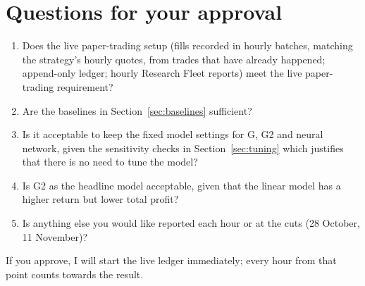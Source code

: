 \documentclass[11pt,a4paper]{article}
\begin{document}
\section{Questions for your approval}\label{sec:questions}
\begin{enumerate}[leftmargin=*]
  \item[$\square$] Does the live paper-trading setup (fills recorded in hourly batches, matching the strategy's
    hourly quotes, from trades that have already happened; append-only ledger; hourly Research Fleet reports) meet
    the live paper-trading requirement?
  \item[$\square$] Are the baselines in Section~\ref{sec:baselines} sufficient?
  \item[$\square$] Is it acceptable to keep the fixed model settings for G, G2 and neural network, given the sensitivity checks in
    Section~\ref{sec:tuning} which justifies that there is no need to tune the model?
  \item[$\square$] Is G2 as the headline model acceptable, given that the linear model has a higher return but
    lower total profit?
  \item[$\square$] Is anything else you would like reported each hour or at the cuts (28 October, 11 November)?
\end{enumerate}
If you approve, I will start the live ledger immediately; every hour from that point counts towards the result.
\end{document}
